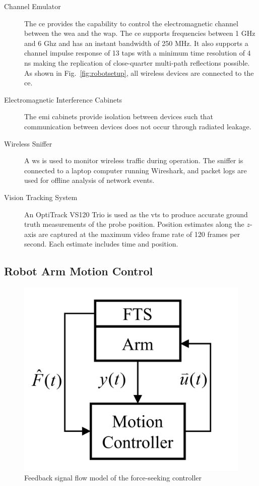 \begin{description}
	\item[Channel Emulator] The \gls{ce} provides the capability to control the electromagnetic channel between the \gls{wea} and the \gls{wap}.  The \gls{ce} supports frequencies between 1 GHz and 6 Ghz and has an instant bandwidth of 250 MHz. It also supports a channel impulse response of 13 taps with a minimum time resolution of 4 ns making the replication of close-quarter multi-path reflections possible.  As shown in Fig.~\ref{fig:robotsetup}, all wireless devices are connected to the \gls{ce}.
	
	\item[Electromagnetic Interference Cabinets] The \Gls{emi} cabinets provide isolation between devices such that communication between devices does not occur through radiated leakage.
	
	\item[Wireless Sniffer]  A \gls{ws} is used to monitor wireless traffic during operation. The sniffer is connected to a laptop computer running Wireshark, and packet logs are used for offline analysis of network events.
	
	\item[Vision Tracking System]  An OptiTrack VS120 Trio is used as the \gls{vts} to produce accurate ground truth measurements of the probe position.  Position estimates along the $z$-axis are captured at the maximum video frame rate of 120 frames per second.  Each estimate includes time and position.
	
\end{description}

\subsection{Robot Arm Motion Control}

\begin{figure}[tbp]
	\centering
	\includegraphics[width=0.4\columnwidth]{./chapter-ftml/diagrams/reef-model}
	\caption{Feedback signal flow model of the force-seeking controller}
	\label{fig:reefmodel}
\end{figure}

